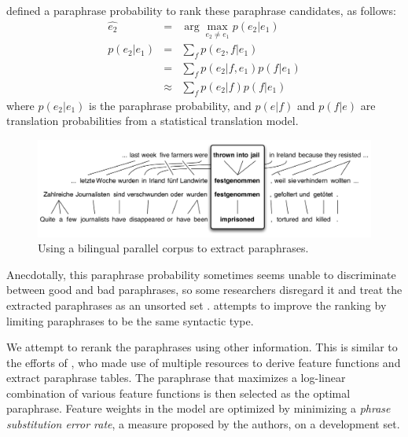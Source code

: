 \documentclass[11pt]{article}
\begin{document}
 defined a paraphrase probability to rank these paraphrase candidates,  as follows:
\begin{eqnarray} 
 \hat{e_2}	& = & \arg \max_{e_2 \neq e_1} p(e_2 | e_1)\label{paraphrase-prob}  \\
  p(e_2|e_1) &=& \sum_f p(e_2,f|e_1)\\
                  &=& \sum_f p(e_2|f,e_1) p(f|e_1) \\
                  &\approx& \sum_f p(e_2|f) p(f|e_1)
\label{paraphrase_prob_eqn}
\end{eqnarray}
where ${p(e_2|e_1)}$ is the paraphrase probability, and ${p(e|f)}$ and ${p(f|e)}$ are translation probabilities from a statistical translation model.  


\begin{figure}
\begin{center}
\includegraphics[width=\linewidth]{pivot-2}
\end{center}
\caption{\small Using a bilingual parallel corpus to extract paraphrases.\vspace{-.12cm}}
\label{paraphrase-illustration}
\end{figure}

Anecdotally, this paraphrase probability sometimes seems unable to discriminate between good and bad paraphrases, so some researchers disregard it and treat the extracted paraphrases as an unsorted set \cite{Snover2010}.   attempts to improve the ranking by limiting paraphrases to be the same syntactic type.  

We attempt to rerank the paraphrases using other information. This is similar to the efforts of , who made use of multiple resources %
to derive feature functions and extract paraphrase tables. The paraphrase that maximizes a log-linear combination of various feature functions is then selected as the optimal paraphrase. Feature weights in the model are optimized by minimizing a {\it phrase substitution error rate}, a measure proposed by the authors, on a development set.
\end{document}
